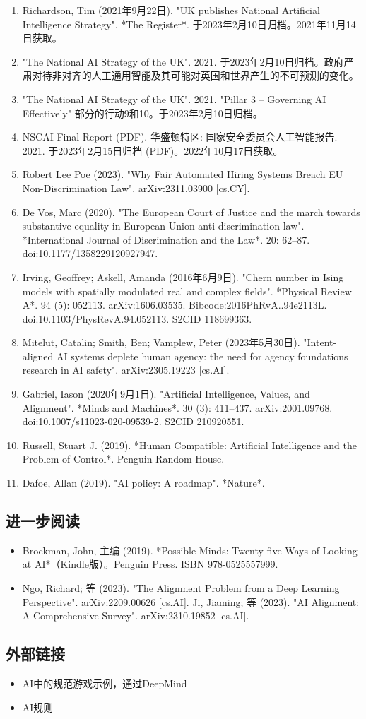 \begin{enumerate}
\item Richardson, Tim (2021年9月22日). "UK publishes National Artificial Intelligence Strategy". *The Register*. 于2023年2月10日归档。2021年11月14日获取。
\item "The National AI Strategy of the UK". 2021. 于2023年2月10日归档。政府严肃对待非对齐的人工通用智能及其可能对英国和世界产生的不可预测的变化。
\item "The National AI Strategy of the UK". 2021. "Pillar 3 – Governing AI Effectively" 部分的行动9和10。于2023年2月10日归档。
\item NSCAI Final Report (PDF). 华盛顿特区: 国家安全委员会人工智能报告. 2021. 于2023年2月15日归档 (PDF)。2022年10月17日获取。
\item Robert Lee Poe (2023). "Why Fair Automated Hiring Systems Breach EU Non-Discrimination Law". arXiv:2311.03900 [cs.CY].
\item De Vos, Marc (2020). "The European Court of Justice and the march towards substantive equality in European Union anti-discrimination law". *International Journal of Discrimination and the Law*. 20: 62–87. doi:10.1177/1358229120927947.
\item Irving, Geoffrey; Askell, Amanda (2016年6月9日). "Chern number in Ising models with spatially modulated real and complex fields". *Physical Review A*. 94 (5): 052113. arXiv:1606.03535. Bibcode:2016PhRvA..94e2113L. doi:10.1103/PhysRevA.94.052113. S2CID 118699363.
\item Mitelut, Catalin; Smith, Ben; Vamplew, Peter (2023年5月30日). "Intent-aligned AI systems deplete human agency: the need for agency foundations research in AI safety". arXiv:2305.19223 [cs.AI].
\item Gabriel, Iason (2020年9月1日). "Artificial Intelligence, Values, and Alignment". *Minds and Machines*. 30 (3): 411–437. arXiv:2001.09768. doi:10.1007/s11023-020-09539-2. S2CID 210920551.
\item Russell, Stuart J. (2019). *Human Compatible: Artificial Intelligence and the Problem of Control*. Penguin Random House.
\item Dafoe, Allan (2019). "AI policy: A roadmap". *Nature*.
\end{enumerate}
\subsection{进一步阅读}
\begin{itemize}
\item Brockman, John, 主编 (2019). *Possible Minds: Twenty-five Ways of Looking at AI*（Kindle版）。Penguin Press. ISBN 978-0525557999.
\item Ngo, Richard; 等 (2023). "The Alignment Problem from a Deep Learning Perspective". arXiv:2209.00626 [cs.AI].
Ji, Jiaming; 等 (2023). "AI Alignment: A Comprehensive Survey". arXiv:2310.19852 [cs.AI].
\end{itemize}
\subsection{外部链接}
\begin{itemize}
\item AI中的规范游戏示例，通过DeepMind
\item AI规则
\end{itemize}
